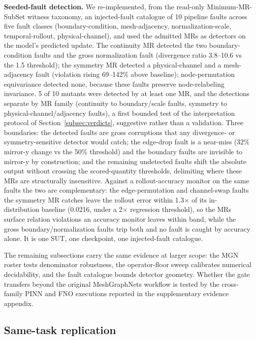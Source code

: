 \documentclass[preprint,12pt]{elsarticle}
\begin{document}
\textbf{Seeded-fault detection.} We re-implemented, from the read-only Minimum-MR-SubSet witness taxonomy, an injected-fault catalogue of 10 pipeline faults across five fault classes (boundary-condition, mesh-adjacency, normalization-scale, temporal-rollout, physical-channel), and used the admitted MRs as detectors on the model's predicted update. The continuity MR detected the two boundary-condition faults and the gross normalization fault (divergence ratio 3.8--10.6 vs the 1.5 threshold); the symmetry MR detected a physical-channel and a mesh-adjacency fault (violation rising 69--142\% above baseline); node-permutation equivariance detected none, because these faults preserve node-relabeling invariance. 5 of 10 mutants were detected by at least one MR, and the detections separate by MR family (continuity to boundary/scale faults, symmetry to physical-channel/adjacency faults), a first bounded test of the interpretation protocol of Section~\ref{subsec:verdicts}, suggestive rather than a validation. Three boundaries: the detected faults are gross corruptions that any divergence- or symmetry-sensitive detector would catch; the edge-drop fault is a near-miss (32\% mirror-y change vs the 50\% threshold) and the boundary faults are invisible to mirror-y by construction; and the remaining undetected faults shift the absolute output without crossing the scored-quantity thresholds, delimiting where these MRs are structurally insensitive. Against a rollout-accuracy monitor on the same faults the two are complementary: the edge-permutation and channel-swap faults the symmetry MR catches leave the rollout error within 1.3$\times$ of its in-distribution baseline (0.0216, under a 2$\times$ regression threshold), so the MRs surface relation violations an accuracy monitor leaves within band, while the gross boundary/normalization faults trip both and no fault is caught by accuracy alone. It is one SUT, one checkpoint, one injected-fault catalogue.

The remaining subsections carry the same evidence at larger scope: the MGN roster tests denominator robustness, the operator-floor sweep calibrates numerical decidability, and the fault catalogue bounds detector geometry. Whether the gate transfers beyond the original MeshGraphNets workflow is tested by the cross-family PINN and FNO executions reported in the supplementary evidence appendix.

\subsection{Same-task replication}
\label{subsec:multicheckpoint-replication}
\end{document}
